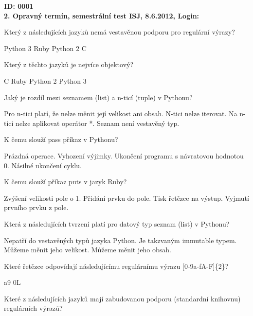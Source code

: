 \documentclass[addpoints,12pt]{exam}
\begin{document}
\setlength{\parindent}{0in}
\pagestyle{empty}
\textbf{ID: 0001}
\\
\textbf{2. Opravný termín, semestrální test ISJ, 8.6.2012, Login:}
\\
\hrulefill
\begin{questions}

\question[2]
Který z následujících jazyků nemá vestavěnou podporu pro regulární výrazy?
\nopagebreak
\begin{choices}
\choice
Python 3
\choice
Ruby
\choice
Python 2
\choice
C
\end{choices}
\question[2]
Který z těchto jazyků je nejvíce objektový?
\nopagebreak
\begin{choices}
\choice
C
\choice
Ruby
\choice
Python 2
\choice
Python 3
\end{choices}
\question[2]
Jaký je rozdíl mezi seznamem (list) a n-ticí (tuple) v Pythonu?
\nopagebreak
\begin{choices}
\choice
Pro n-tici platí, že nelze měnit její velikost ani obsah.
\choice
N-tici nelze iterovat.
\choice
Na n-tici nelze aplikovat operátor *.
\choice
Seznam není vestavěný typ.
\end{choices}
\question[2]
K čemu slouží pass příkaz v Pythonu?
\nopagebreak
\begin{choices}
\choice
Prázdná operace.
\choice
Vyhození výjimky.
\choice
Ukončení programu s návratovou hodnotou 0.
\choice
Násilné ukončení cyklu.
\end{choices}
\question[2]
K čemu slouží příkaz puts v jazyk Ruby?
\nopagebreak
\begin{choices}
\choice
Zvýšení velikosti pole o 1.
\choice
Přidání prvku do pole.
\choice
Tisk řetězce na výstup.
\choice
Vyjmutí prvního prvku z pole.
\end{choices}
\question[2]
Která z následujících tvrzení platí pro datový typ seznam (list) v Pythonu?
\nopagebreak
\begin{choices}
\choice
Nepatří do vestavěných typů jazyka Python.
\choice
Je takzvaným immutable typem.
\choice
Můžeme měnit jeho velikost.
\choice
Můžeme měnit jeho obsah.
\end{choices}
\question[2]
Které řetězce odpovídají následujícímu regulárnímu výrazu [0-9a-fA-F]\{2\}?
\nopagebreak
\begin{choices}
\choice
a9
\choice
0L
\end{choices}
\question[2]
Které z následujících jazyků mají zabudovanou podporu (standardní knihovnu) regulárních výrazů?
\nopagebreak
\begin{choices}

\end{choices}
\end{questions}
\end{document}

